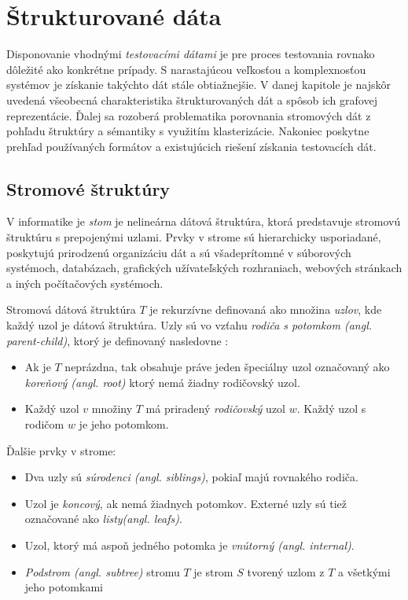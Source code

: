 \chapter{Štrukturované dáta} 
\label{struktury}

Disponovanie vhodnými \textit{testovacími dátami} je pre proces testovania rovnako dôležité ako konkrétne prípady. S narastajúcou veľkosťou a komplexnosťou systémov je získanie takýchto dát stále obtiažnejšie. V danej kapitole je najskôr uvedená všeobecná charakteristika štrukturovaných dát a spôsob ich grafovej reprezentácie. Ďalej sa rozoberá problematika  porovnania stromových dát z pohľadu štruktúry a sémantiky s využitím klasterizácie. Nakoniec poskytne prehľad používaných formátov a existujúcich riešení získania testovacích dát.


\section{Stromové štruktúry}
V informatike je \textit{stom} je nelineárna dátová štruktúra, ktorá predstavuje stromovú štruktúru s prepojenými uzlami. Prvky v strome sú hierarchicky usporiadané, poskytujú prirodzenú organizáciu dát a sú všadeprítomné v súborových systémoch, databázach, grafických užívateľských rozhraniach, webových stránkach a iných počítačových systémoch. 

Stromová dátová štruktúra \(T\) je rekurzívne definovaná ako množina \textit{uzlov}, kde každý uzol je dátová štruktúra. Uzly sú vo vzťahu \textit{rodiča s potomkom (angl. parent-child)}, ktorý je definovaný nasledovne \cite{Dsaj}:
\begin{itemize}
	\item{Ak je \(T\) neprázdna, tak obsahuje práve jeden špeciálny uzol označovaný ako \textit{koreňový (angl. root)} ktorý nemá žiadny rodičovský uzol.
	}
	\item{Každý uzol \(v\) množiny \(T\) má priradený \textit{rodičovský} uzol \(w\). Každý uzol s rodičom \(w\) je jeho potomkom.
	}	
\end{itemize}
Ďalšie prvky v strome:
\begin{itemize}
	\item{Dva uzly sú \textit{súrodenci (angl. siblings)}, pokiaľ majú rovnakého rodiča.
	}
	\item{Uzol je \textit{koncový}, ak nemá žiadnych potomkov. Externé uzly sú tiež označované ako \textit{listy(angl. leafs)}. 
	}
	\item{Uzol, ktorý má aspoň jedného potomka je \textit{vnútorný (angl. internal)}.
	}	
	\item{\textit{Podstrom (angl. subtree)} stromu \(T\) je strom \(S\) tvorený uzlom z \(T\) a všetkými jeho potomkami
	}		
\end{itemize} 
